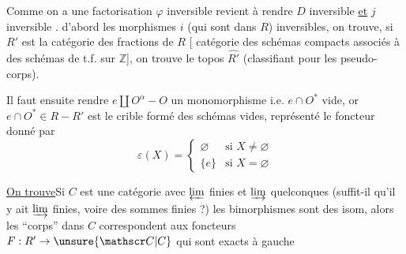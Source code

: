 
Comme on a une factorisation
 $\varphi$ inversible revient à rendre $D$ inversible \uline{et} $j$ inversible .  d'abord les morphismes $i$ (qui sont dans $R$) inversibles, on trouve, si $R'$ est la catégorie des fractions de $R$ [ catégorie des schémas compacts associés à des schémas de t.f. sur $\mathbb Z$], on trouve le topos $\widehat{R'}$ (classifiant pour les pseudo-corps).

Il faut ensuite rendre $e\amalg O^\alpha\mathbin{-}O$ un monomorphisme i.e.   $e\cap O^\ast$ vide, or $e\cap O^\ast\in R\mathbin{-}R'$ est le crible formé des schémas vides, représenté le foncteur  donné par
\[
\varepsilon(X)=\begin{cases}
\varnothing&\text{si }X\ne\varnothing\\
\{e\}&\text{si }X=\varnothing
\end{cases}
\]

\margin{$\Big\Vert$}\uline{On trouve}\quad Si $C$ est une catégorie avec $\varprojlim$ finies et $\varinjlim$ quelconques (suffit-il qu'il y ait $\varinjlim$ finies, voire des sommes finies ?)   les  bimorphismes sont des isom, alors les ``corps'' dans $C$ correspondent aux foncteurs $F:R'\to\unsure{\mathscr C|C}$ qui  sont exacts à gauche 
